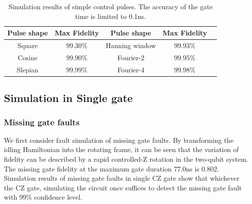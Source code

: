 \documentclass[conference, 9pt]{IEEEtran}
\begin{document}
\begin{table}
\centering
  \caption{Simulation results of simple control pulses. The accuracy of the gate time is limited to 0.1ns.}
  \label{tab:bench}
  \begin{tabular}{ccccl}
    \toprule
    Pulse shape & Max Fidelity & Pulse shape & Max Fidelity\\
    \midrule
    Square  &  $99.30\%$ & Hanning window  & $99.93\%$ \\
    Cosine  &  $99.90\%$ & Fourier-2 & $99.95\%$ \\
    Slepian &  $99.99\%$ & Fourier-4 & $99.98\%$ \\
    
  \bottomrule
\end{tabular}
\end{table}
\subsection{Simulation in Single gate}
\subsubsection{Missing gate faults}
We first consider fault simulation of missing gate faults. By transforming the idling Hamiltonian into the rotating frame, it can be seen that the variation of fidelity can be described by a rapid controlled-Z rotation in the two-qubit system. The missing gate fidelity at the maximum gate duration 77.0ns is 0.802. Simulation results of missing gate faults in single CZ gate show that whichever the CZ gate, simulating the circuit once suffices to detect the missing gate fault with 99\% confidence level. 

\end{document}
